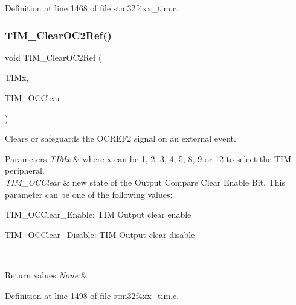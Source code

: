 Definition at line 1468 of file stm32f4xx\+\_\+tim.\+c.

\mbox{\label{group___t_i_m___group2_gac474ebc815d24c8a589969e0c68b27b0}} 
\subsubsection{\texorpdfstring{T\+I\+M\+\_\+\+Clear\+O\+C2\+Ref()}{TIM\_ClearOC2Ref()}}
{\footnotesize\ttfamily void T\+I\+M\+\_\+\+Clear\+O\+C2\+Ref (\begin{DoxyParamCaption}\item[{\hyperlink{struct_t_i_m___type_def}{T\+I\+M\+\_\+\+Type\+Def} $\ast$}]{T\+I\+Mx,  }\item[{uint16\+\_\+t}]{T\+I\+M\+\_\+\+O\+C\+Clear }\end{DoxyParamCaption})}



Clears or safeguards the O\+C\+R\+E\+F2 signal on an external event. 


\begin{DoxyParams}{Parameters}
{\em T\+I\+Mx} & where x can be 1, 2, 3, 4, 5, 8, 9 or 12 to select the T\+IM peripheral. \\
\hline
{\em T\+I\+M\+\_\+\+O\+C\+Clear} & new state of the Output Compare Clear Enable Bit. This parameter can be one of the following values\+: \begin{DoxyItemize}
\item T\+I\+M\+\_\+\+O\+C\+Clear\+\_\+\+Enable\+: T\+IM Output clear enable \item T\+I\+M\+\_\+\+O\+C\+Clear\+\_\+\+Disable\+: T\+IM Output clear disable \end{DoxyItemize}
\\
\hline
\end{DoxyParams}

\begin{DoxyRetVals}{Return values}
{\em None} & \\
\hline
\end{DoxyRetVals}


Definition at line 1498 of file stm32f4xx\+\_\+tim.\+c.

\mbox{\label{group___t_i_m___group2_ga0bd9476a14bd346c319945ec4fa2bc67}} 
